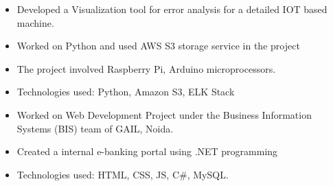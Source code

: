 \documentclass[10pt,a4paper]{altacv}
\begin{document}

\begin{fullwidth}
\makecvheader
\end{fullwidth}


\begin{itemize}
\item Developed a Visualization tool for error analysis for a detailed IOT based machine.
\item Worked on Python and used AWS S3 storage service in the project
\item The project involved Raspberry Pi, Arduino microprocessors.
\item Technologies used: Python, Amazon S3, ELK Stack
\end{itemize}

\divider

\begin{itemize}
\item Worked on Web Development Project under the Business Information Systems (BIS) team of GAIL, Noida.
\item Created a internal e-banking portal using .NET programming
\item Technologies used: HTML, CSS, JS, C\#, MySQL.
\end{itemize}

\medskip
\end{document}

